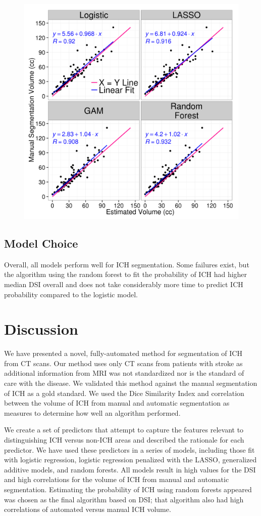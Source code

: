 \documentclass{elsarticle_nonatbib}\usepackage[]{graphicx}\usepackage[]{color}
\begin{document}
\begin{figure}
\centering

\includegraphics[width=0.75\linewidth,keepaspectratio]{Reseg_Volume_Comparison.png}
\caption{}
\label{fig:vol}
\end{figure}

\subsection{Model Choice}
Overall, all models perform well for ICH segmentation.  Some failures exist, but the algorithm using the random forest to fit the probability of ICH had higher median DSI overall and does not take considerably more time to predict ICH probability compared to the logistic model.  



\section{Discussion}
We have presented a novel, fully-automated method for segmentation of ICH from CT scans. Our method uses only CT scans from patients with stroke as additional information from MRI was not standardized nor is the standard of care with the disease. We validated this method against the manual segmentation of ICH as a gold standard.  We used the Dice Similarity Index and correlation between the volume of ICH from manual and automatic segmentation as measures to determine how well an algorithm performed.  

We create a set of predictors that attempt to capture the features relevant to distinguishing ICH versus non-ICH areas and described the rationale for each predictor.  We have used these predictors in a series of models, including those fit with logistic regression, logistic regression penalized with the LASSO, generalized additive models, and random forests.  All models result in high values for the DSI and high correlations for the volume of ICH from manual and automatic segmentation. Estimating the probability of ICH using random forests appeared was chosen as the final algorithm based on DSI; that algorithm also had high correlations of automated versus manual ICH volume.  
\end{document}
